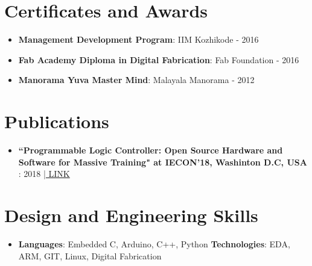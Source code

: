 \documentclass[a4paper,10pt]{article}
\newcommand{\resumeItem}[2]{
  \item\small{
    \textbf{#1}{: #2 \vspace{-2pt}}
  }
}
\newcommand{\resumeSubItem}[2]{\resumeItem{#1}{#2}\vspace{-4pt}}
\newcommand{\resumeSubHeadingListStart}{\begin{itemize}[leftmargin=*]}
\newcommand{\resumeSubHeadingListEnd}{\end{itemize}}
\begin{document}
\section{Certificates and Awards}
  \resumeSubHeadingListStart
    \resumeSubItem{Management Development Program}{IIM Kozhikode - 2016}
    \resumeSubItem{Fab Academy Diploma in Digital Fabrication}{Fab Foundation - 2016}
    \resumeSubItem{Manorama Yuva Master Mind}{Malayala Manorama - 2012}
  \resumeSubHeadingListEnd

\section{Publications}
  \resumeSubHeadingListStart
    \resumeSubItem{``Programmable Logic Controller: Open Source
Hardware and Software for Massive Training" at IECON'18, Washinton D.C, USA }{2018} \href{https://ieeexplore.ieee.org/abstract/document/8592772/}{| LINK}
  \resumeSubHeadingListEnd


\section{Design and Engineering Skills}
 \resumeSubHeadingListStart
   \item{
     \textbf{Languages}{: Embedded C, Arduino, C++, Python}
     \hfill
     \textbf{Technologies}{: EDA, ARM, GIT, Linux, Digital Fabrication}
   }
 \resumeSubHeadingListEnd


\end{document}
